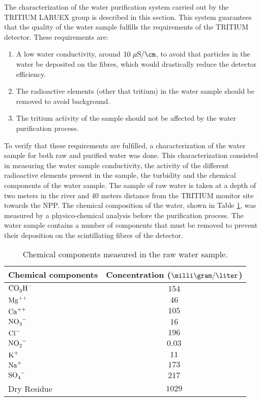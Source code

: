 The characterization of the water purification system carried out by the TRITIUM LARUEX group is described in this section. This system guarantees that the quality of the water sample fulfills the requirements of the TRITIUM detector. These requirements are:

\begin{enumerate}
\item{} A low water conductivity, around $10~\mu\text{S}/\cm$, to avoid that particles in the water be deposited on the fibres, which would drastically reduce the detector efficiency.

\item{} The radioactive elements (other that tritium) in the water sample should be removed to avoid background.

\item{} The tritium activity of the sample should not be affected by the water purification process. 

\end{enumerate}

To verify that these requirements are fulfilled, a characterization of the water sample for both raw and purified water was done. This characterization consisted in measuring the water sample conductivity, the activity of the different radioactive elements present in the sample, the turbidity and the chemical components of the water sample. The sample of raw water is taken at a depth of two meters in the river and 40 meters distance from the TRITIUM monitor site towards the NPP. The chemical composition of the water, shown in Table \ref{tab:ChemicalComponentsRawWater}, was measured by a physico-chemical analysis before the purification process. The water sample contains a number of components that must be removed to prevent their deposition on the scintillating fibres of the detector.

\begin{table}[htbp]
\centering{}%
\begin{tabular}{lc}
\toprule 
Chemical components & Concentration ($\milli\gram/\liter$) \tabularnewline
\midrule
\midrule 
$\ce{CO_{3}H^-}$ & $154$ \tabularnewline
$\ce{Mg^{++}}$ & $46$ \tabularnewline
$\ce{Ca^{++}}$ & $105$ \tabularnewline
$\ce{NO_{3}^-}$ & $16$ \tabularnewline
$\ce{Cl^-}$ & $196$ \tabularnewline
$\ce{NO_{2}^-}$ & $0.03$ \tabularnewline
$\ce{K^{+}}$ & $11$ \tabularnewline
$\ce{Na^{+}}$ & $173$ \tabularnewline
$\ce{SO_{4}^-}$ & $217$ \tabularnewline
Dry Residue & $1029$ \tabularnewline
\bottomrule
\end{tabular}
\caption{Chemical components measured in the raw water sample.}
\label{tab:ChemicalComponentsRawWater}
\end{table}

